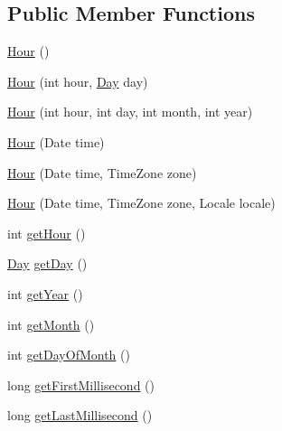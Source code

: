 \subsection*{Public Member Functions}
\begin{DoxyCompactItemize}
\item 
\mbox{\hyperlink{classorg_1_1jfree_1_1data_1_1time_1_1_hour_a60c6768390866620249b5709585143b3}{Hour}} ()
\item 
\mbox{\hyperlink{classorg_1_1jfree_1_1data_1_1time_1_1_hour_a69787e94a0d8748388a8e0677e2ea0e0}{Hour}} (int hour, \mbox{\hyperlink{classorg_1_1jfree_1_1data_1_1time_1_1_day}{Day}} day)
\item 
\mbox{\hyperlink{classorg_1_1jfree_1_1data_1_1time_1_1_hour_a267685232d7795d5a8ec392e8d014b2c}{Hour}} (int hour, int day, int month, int year)
\item 
\mbox{\hyperlink{classorg_1_1jfree_1_1data_1_1time_1_1_hour_a4f82fac15e0ba3feff65dfc952b6ce4e}{Hour}} (Date time)
\item 
\mbox{\hyperlink{classorg_1_1jfree_1_1data_1_1time_1_1_hour_a39484e8aba4992be74cf5a69d8b1f86e}{Hour}} (Date time, Time\+Zone zone)
\item 
\mbox{\hyperlink{classorg_1_1jfree_1_1data_1_1time_1_1_hour_a95089caa6309be1da0cd6e46e54ab66a}{Hour}} (Date time, Time\+Zone zone, Locale locale)
\item 
int \mbox{\hyperlink{classorg_1_1jfree_1_1data_1_1time_1_1_hour_ab93b3e87c51ed54b7f916722c1473800}{get\+Hour}} ()
\item 
\mbox{\hyperlink{classorg_1_1jfree_1_1data_1_1time_1_1_day}{Day}} \mbox{\hyperlink{classorg_1_1jfree_1_1data_1_1time_1_1_hour_a064771929fee2fefb995e61c2d0992c3}{get\+Day}} ()
\item 
int \mbox{\hyperlink{classorg_1_1jfree_1_1data_1_1time_1_1_hour_a567bbb7a156676712f4f88556d01c551}{get\+Year}} ()
\item 
int \mbox{\hyperlink{classorg_1_1jfree_1_1data_1_1time_1_1_hour_aa7f16656095d85ecb6897d59f95d7a6f}{get\+Month}} ()
\item 
int \mbox{\hyperlink{classorg_1_1jfree_1_1data_1_1time_1_1_hour_a7b2485bf87de65dc09e281fbfc534c37}{get\+Day\+Of\+Month}} ()
\item 
long \mbox{\hyperlink{classorg_1_1jfree_1_1data_1_1time_1_1_hour_a180071a5f4e36222323074f091ed733f}{get\+First\+Millisecond}} ()
\item 
long \mbox{\hyperlink{classorg_1_1jfree_1_1data_1_1time_1_1_hour_af4e68aff2d3a8379ec6f61ce3911f3ae}{get\+Last\+Millisecond}} ()
\item 

\end{DoxyCompactItemize}
